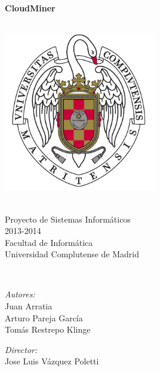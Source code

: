 \begin{titlepage}
\begin{center}




\HRule \\[0.4cm]
{ \huge \bfseries CloudMiner \\[0.4cm] }

\HRule \\[1.0cm]

\includegraphics[width=0.5\textwidth]{./logoucm}

~\\

\Large Proyecto de Sistemas Inform\'aticos\\
\Large 2013-2014\\
\Large Facultad de Inform\'atica\\
\Large Universidad Complutense de Madrid

~\\[1.0cm]

\begin{minipage}{0.4\textwidth}
\begin{flushleft} %
\centering
\emph{Autores:}\\
Juan Arratia \\ Arturo Pareja Garc\'ia \\ Tom\'as Restrepo Klinge \\[1.0cm]
\end{flushleft}
\end{minipage}
\begin{minipage}{0.4\textwidth}
\begin{flushright} %
\centering
\emph{Director:} \\
Jose Luis V\'azquez Poletti

\end{flushright}
\end{minipage}

\vfill


\end{center}
\end{titlepage}